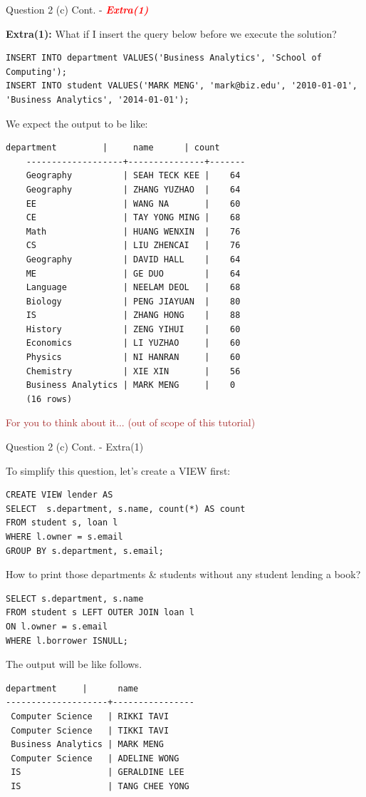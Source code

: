 \begin{frame}[fragile]{Question 2 (c) Cont. - \textcolor{red}{\textit{\textbf{Extra(1)}}}}
	
\textbf{Extra(1):} What if I insert the query below before we execute the solution?
\begin{lstlisting}[style=sql-small]
INSERT INTO department VALUES('Business Analytics', 'School of Computing');
INSERT INTO student VALUES('MARK MENG', 'mark@biz.edu', '2010-01-01', 'Business Analytics', '2014-01-01');
\end{lstlisting}
We expect the output to be like:\\
\begin{lstlisting}[style=terminal-tiny]	
	department         |     name      | count
	-------------------+---------------+-------
	Geography          | SEAH TECK KEE |    64
	Geography          | ZHANG YUZHAO  |    64
	EE                 | WANG NA       |    60
	CE                 | TAY YONG MING |    68
	Math               | HUANG WENXIN  |    76
	CS                 | LIU ZHENCAI   |    76
	Geography          | DAVID HALL    |    64
	ME                 | GE DUO        |    64
	Language           | NEELAM DEOL   |    68
	Biology            | PENG JIAYUAN  |    80
	IS                 | ZHANG HONG    |    88
	History            | ZENG YIHUI    |    60
	Economics          | LI YUZHAO     |    60
	Physics            | NI HANRAN     |    60
	Chemistry          | XIE XIN       |    56
	Business Analytics | MARK MENG     |    0
	(16 rows)
\end{lstlisting}

\textcolor{brown}{For you to think about it... (out of scope of this tutorial)}
\end{frame}

\begin{frame}[fragile]{Question 2 (c) Cont. - Extra(1)}
	
To simplify this question, let's create a VIEW first:
\begin{lstlisting}[style=sql-small]
CREATE VIEW lender AS
SELECT  s.department, s.name, count(*) AS count
FROM student s, loan l
WHERE l.owner = s.email
GROUP BY s.department, s.email;
\end{lstlisting}\vspace{3pt}

How to print those departments \& students without any student lending a book?
\begin{lstlisting}[style=sql-small]
SELECT s.department, s.name
FROM student s LEFT OUTER JOIN loan l 
ON l.owner = s.email
WHERE l.borrower ISNULL;
\end{lstlisting}\vspace{3pt}

The output will be like follows.
\begin{lstlisting}[style=terminal-tiny]
     department     |      name      
--------------------+----------------
 Computer Science   | RIKKI TAVI
 Computer Science   | TIKKI TAVI
 Business Analytics | MARK MENG
 Computer Science   | ADELINE WONG
 IS                 | GERALDINE LEE
 IS                 | TANG CHEE YONG
\end{lstlisting}

\end{frame}

